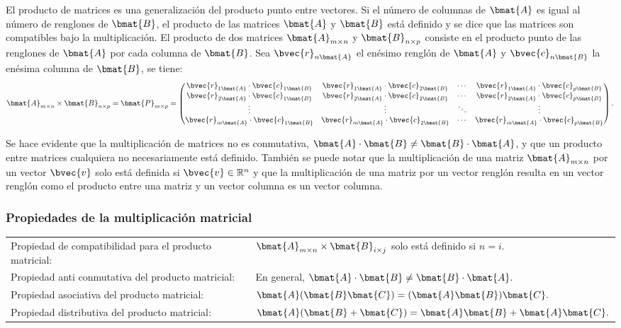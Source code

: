 \documentclass{fmbnotes}
\begin{document}
El producto de matrices es una generalización del producto punto entre vectores. Si el número de columnas
de \( \bmat{A} \) es igual al número de renglones de \( \bmat{B} \), el producto de las matrices \( \bmat{A} \) y \( \bmat{B} \) está definido y se dice que las matrices son compatibles bajo la multiplicación. El producto de dos matrices \( \bmat{A}_{m \times n} \) y \( \bmat{B}_{n \times p} \) consiste en el producto punto de las renglones de \( \bmat{A} \) por cada columna de \( \bmat{B} \). Sea \(\bvec{r}_{n\bmat{A}}\) el enésimo renglón de \( \bmat{A} \) y \( \bvec{c}_{n\bmat{B}} \) la enésima columna de \( \bmat{B} \), se tiene:
\[ \bmat{A}_{m \times n} \times \bmat{B}_{n \times p} = \bmat{P}_{m \times p} =\begin{pmatrix}
	\bvec{r}_{1\bmat{A}} \cdot  \bvec{c}_{1\bmat{B}} & \bvec{r}_{1\bmat{A}} \cdot  \bvec{c}_{2\bmat{B}} & \cdots & \bvec{r}_{1\bmat{A}} \cdot  \bvec{c}_{p\bmat{B}} \\
	\bvec{r}_{2\bmat{A}} \cdot  \bvec{c}_{1\bmat{B}} & \bvec{r}_{2\bmat{A}} \cdot  \bvec{c}_{2\bmat{B}} & \cdots & \bvec{r}_{2\bmat{A}} \cdot  \bvec{c}_{p\bmat{B}} \\
	\vdots & \vdots & \ddots & \vdots  \\
	\bvec{r}_{m\bmat{A}} \cdot  \bvec{c}_{1\bmat{B}} & \bvec{r}_{m\bmat{A}} \cdot  \bvec{c}_{2\bmat{B}} & \cdots & \bvec{r}_{m\bmat{A}} \cdot  \bvec{c}_{p\bmat{B}} \\
	\end{pmatrix}.\]

Se hace evidente que la multiplicación de matrices no es conmutativa, \( \bmat{A} \cdot \bmat{B} \neq \bmat{B} \cdot \bmat{A} \), y que un producto entre matrices cualquiera no necesariamente está definido. También se puede notar que la multiplicación de una matriz \( \bmat{A}_{m \times n} \) por un vector \( \bvec{v} \) solo está definida si \(\bvec{v} \in \mathbb{R}^{n}\) y que la multiplicación de una matriz por un vector renglón resulta en un vector renglón como el producto entre una matriz y un vector columna es un vector columna.

\subsubsection{Propiedades de la multiplicación matricial}

\begin{tabular}{lp{}}
	\rule[1ex]{0pt}{2.5ex} Propiedad de compatibilidad para el producto matricial: &  \(\bmat{A}_{m \times n} \times \bmat{B}_{i \times j}\) solo está definido si \(n=i\).\\
	\rule[1ex]{0pt}{2.5ex} Propiedad anti conmutativa del producto matricial: &  En general, \(\bmat{A} \cdot \bmat{B} \neq \bmat{B} \cdot \bmat{A}.\)   \\
	\rule[1ex]{0pt}{2.5ex} Propiedad asociativa del producto matricial: &  \(\bmat{A}(\bmat{B}\bmat{C}) = (\bmat{A}\bmat{B})\bmat{C}.\) \\
	\rule[1ex]{0pt}{2.5ex} Propiedad distributiva del producto matricial: &  \(\bmat{A}(\bmat{B} + \bmat{C}) = \bmat{A}\bmat{B} + \bmat{A}\bmat{C}.\)
\end{tabular}
\end{document}
